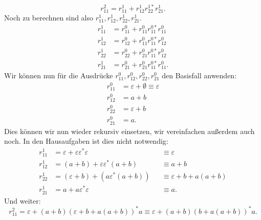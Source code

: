 \documentclass[11pt, a4paper]{article}
\begin{document}
\[
	r_{11}^2 = r_{11}^1 + r_{12}^1 r_{22}^{1\ast} r_{21}^1.
\]
Noch zu berechnen sind also \( r_{11}^1, r_{12}^1, r_{22}^1, r_{21}^1 \).
\begin{align*}
	r_{11}^1 &= r_{11}^0 + r_{11}^0 r_{11}^{0\ast} r_{11}^0\\
	r_{12}^1 &= r_{12}^0 + r_{11}^0 r_{11}^{0\ast} r_{12}^0\\
	r_{22}^1 &= r_{22}^0 + r_{21}^0 r_{11}^{0\ast} r_{12}^0\\
	r_{21}^1 &= r_{21}^0 + r_{21}^0 r_{11}^{0\ast} r_{11}^0.
\end{align*}
Wir können nun für die Ausdrücke \( r_{11}^0, r_{12}^0, r_{22}^0, r_{21}^0 \) den Basisfall anwenden:
\begin{align*}
	r_{11}^0 &= \varepsilon + \emptyset \equiv \varepsilon\\
	r_{12}^0 &= a + b\\
	r_{22}^0 &= \varepsilon + b\\
	r_{21}^0 &= a.
\end{align*}
Dies können wir nun wieder rekursiv einsetzen, wir vereinfachen außerdem auch noch. In den Hausaufgaben ist dies nicht notwendig:
\begin{align*}
	r_{11}^1 &= \varepsilon + \varepsilon \varepsilon^\ast \varepsilon &&\equiv \varepsilon\\
	r_{12}^1 &= (a + b) + \varepsilon \varepsilon^\ast (a + b) &&\equiv a + b\\
	r_{22}^1 &= (\varepsilon + b) + (a \varepsilon^\ast (a + b)) &&\equiv \varepsilon + b + a(a + b)\\
	r_{21}^1 &= a + a \varepsilon^\ast \varepsilon &&\equiv a.
\end{align*}
Und weiter:
\[
	r_{11}^2 = \varepsilon + (a + b) (\varepsilon + b + a(a+b))^\ast a \equiv \varepsilon + (a + b)(b + a(a+b))^\ast a.
\]
\end{document}
